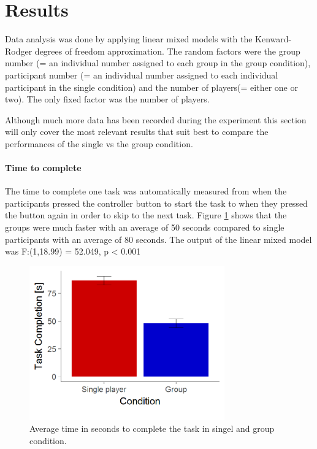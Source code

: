 \documentclass{article}
\begin{document}



\section{Results}
Data analysis was done by applying linear mixed models with the Kenward-Rodger degrees of freedom approximation. The random factors were the group number (= an individual number assigned to each group in the group condition), participant number (= an individual number assigned to each individual participant in the single condition) and the number of players(= either one or two). The only fixed factor was the number of players. 

 Although much more data has been recorded during the experiment this section will only cover the most relevant results that suit best to compare the performances of the single vs the group condition. 

\paragraph{Time to complete}
The time to complete one task was automatically measured from when the participants pressed the controller button to start the task to when they pressed the button again in order to skip to the next task. Figure \ref{fig:results_duration} shows that the groups were much faster with an average of 50 seconds compared to single participants with an average of 80 seconds. The output of the linear mixed model was F:(1,18.99) = 52.049, p < 0.001 

\begin{figure}[h]
\centering
\includegraphics[width=0.75\textwidth]{results_duration}
\caption{Average time in seconds to complete the task in singel and group condition.} \label{fig:results_duration}
\end{figure}
\end{document}
